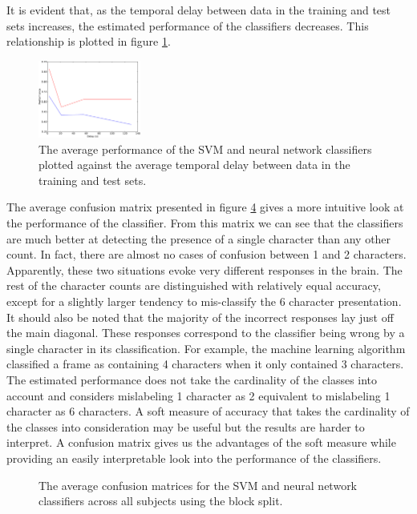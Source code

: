 \documentclass[preprint,5p,authoryear]{elsarticle}
\begin{document}
It is evident that, as the temporal delay between data in the training and test sets increases, the estimated performance of the classifiers decreases.
This relationship is plotted in figure \ref{fig:performance-verse-temporal-distance}.

\begin{figure}
\centering
\includegraphics[width=0.3\textwidth]{figures/performance-verse-temporal-distance}
\caption{The average performance of the SVM and neural network classifiers plotted against the average temporal delay between data in the training and test sets.}
\label{fig:performance-verse-temporal-distance}
\end{figure}

The average confusion matrix presented in figure \ref{fig:average-confusion} gives a more intuitive look at the performance of the classifier.
From this matrix we can see that the classifiers are much better at detecting the presence of a single character than any other count.
In fact, there are almost no cases of confusion between 1 and 2 characters.
Apparently, these two situations evoke very different responses in the brain.
The rest of the character counts are distinguished with relatively equal accuracy,
except for a slightly larger tendency to mis-classify the 6 character presentation.
It should also be noted that the majority of the incorrect responses lay just off the main diagonal.
These responses correspond to the classifier being wrong by a single character in its classification.
For example, the machine learning algorithm classified a frame as containing 4 characters when it only contained 3 characters.
The estimated performance does not take the cardinality of the classes into account and considers mislabeling 1 character as 2 equivalent to mislabeling 1 character as 6 characters.
A soft measure of accuracy that takes the cardinality of the classes into consideration may be useful but the results are harder to interpret.
A confusion matrix gives us the advantages of the soft measure while providing an easily interpretable look into the performance of the classifiers.

\begin{figure}
\centering
\begin{subfigure}{0.3\textwidth}
\centering

\caption{}
\label{fig:average-confusion-svm}
\end{subfigure}
\begin{subfigure}{0.3\textwidth}
\centering

\caption{}
\label{fig:average-confusion-nn}
\end{subfigure}
\caption{The average confusion matrices for the  SVM and  neural network classifiers across all subjects using the block split.}
\label{fig:average-confusion}
\end{figure}
\end{document}
